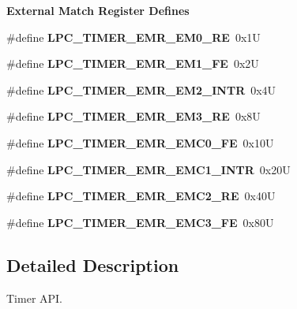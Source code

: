 \begin{Indent}\textbf{ External Match Register Defines}\par
\begin{DoxyCompactItemize}
\item 
\#define {\bfseries L\+P\+C\+\_\+\+T\+I\+M\+E\+R\+\_\+\+E\+M\+R\+\_\+\+E\+M0\+\_\+\+RE}~0x1U
\item 
\#define {\bfseries L\+P\+C\+\_\+\+T\+I\+M\+E\+R\+\_\+\+E\+M\+R\+\_\+\+E\+M1\+\_\+\+FE}~0x2U
\item 
\#define {\bfseries L\+P\+C\+\_\+\+T\+I\+M\+E\+R\+\_\+\+E\+M\+R\+\_\+\+E\+M2\+\_\+\+I\+N\+TR}~0x4U
\item 
\#define {\bfseries L\+P\+C\+\_\+\+T\+I\+M\+E\+R\+\_\+\+E\+M\+R\+\_\+\+E\+M3\+\_\+\+RE}~0x8U
\item 
\#define {\bfseries L\+P\+C\+\_\+\+T\+I\+M\+E\+R\+\_\+\+E\+M\+R\+\_\+\+E\+M\+C0\+\_\+\+FE}~0x10U
\item 
\#define {\bfseries L\+P\+C\+\_\+\+T\+I\+M\+E\+R\+\_\+\+E\+M\+R\+\_\+\+E\+M\+C1\+\_\+\+I\+N\+TR}~0x20U
\item 
\#define {\bfseries L\+P\+C\+\_\+\+T\+I\+M\+E\+R\+\_\+\+E\+M\+R\+\_\+\+E\+M\+C2\+\_\+\+RE}~0x40U
\item 
\#define {\bfseries L\+P\+C\+\_\+\+T\+I\+M\+E\+R\+\_\+\+E\+M\+R\+\_\+\+E\+M\+C3\+\_\+\+FE}~0x80U
\end{DoxyCompactItemize}
\end{Indent}


\subsection{Detailed Description}
Timer A\+PI. 

